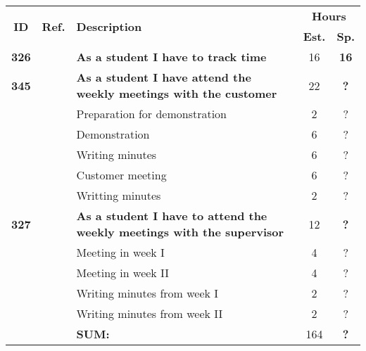 \label{tab:sprint2storiesProcess}
\def\arraystretch{1.25}
 
\begin{longtable}{ccXcc}

\toprule[0.5mm]
\multirow{2}{*}{\textbf{ID}} &
\multirow{2}{*}{\textbf{Ref.}} & \multirow{2}{*}{\textbf{Description}} & \multicolumn{2}{c}{\textbf{Hours}} \\
 					& & & \textbf{Est.} & \textbf{Sp.} \\
\midrule

\textbf{326} 	& 
	& {\bf  As a student I have to track time} 	& 		16	& \textbf{16} \\
\textbf{345} 	& 
	& {\bf As a student I have attend the weekly meetings with the customer} 	
	& 	22	
	& \textbf{?} \\
		&& Preparation for demonstration	& 2 & ? \\
		&& Demonstration	& 6  & ? \\
		&& Writing minutes 	&  6 & ? \\	
		&& Customer meeting	&  6 & ? \\
		&& Writting minutes	&  2 & ? \\
		
\textbf{327} 	& 
	& {\bf As a student I have to attend the weekly meetings with the supervisor} 	
	& 	12	
	& \textbf{?} \\
		&& Meeting in week I	& 4 & ? \\
		&& Meeting in week II	& 4 & ? \\
		&& Writing minutes from week I 	&  2 & ? \\
		&& Writing minutes from week II	&  2 & ? \\	
				
				
\hline
				&& \textbf{SUM:}		&		164	& \textbf{?}
 \\																			
\bottomrule[0.5mm]
\end{longtable}
